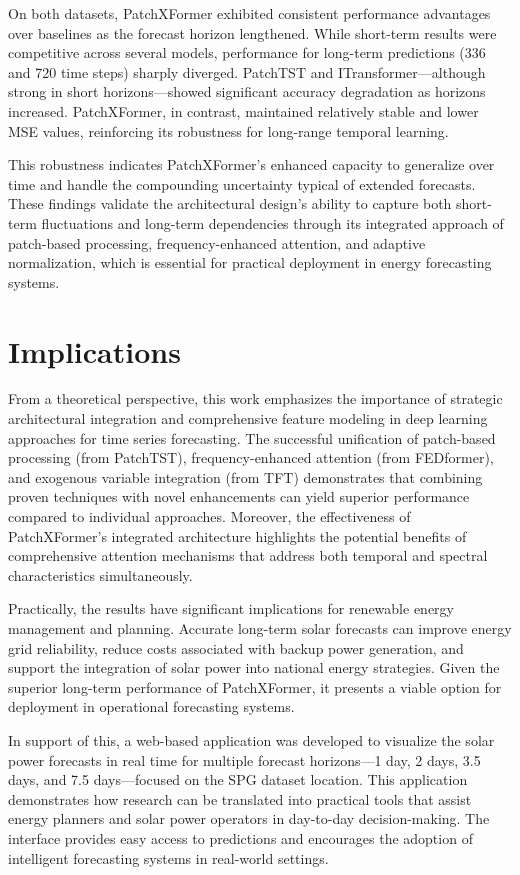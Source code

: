 \documentclass[12pt]{uomthesis}
\begin{document}
On both datasets, PatchXFormer exhibited consistent performance advantages over baselines as the forecast horizon lengthened. While short-term results were competitive across several models, performance for long-term predictions (336 and 720 time steps) sharply diverged. PatchTST and ITransformer—although strong in short horizons—showed significant accuracy degradation as horizons increased. PatchXFormer, in contrast, maintained relatively stable and lower MSE values, reinforcing its robustness for long-range temporal learning.

This robustness indicates PatchXFormer's enhanced capacity to generalize over time and handle the compounding uncertainty typical of extended forecasts. These findings validate the architectural design's ability to capture both short-term fluctuations and long-term dependencies through its integrated approach of patch-based processing, frequency-enhanced attention, and adaptive normalization, which is essential for practical deployment in energy forecasting systems.

\section{Implications}

From a theoretical perspective, this work emphasizes the importance of strategic architectural integration and comprehensive feature modeling in deep learning approaches for time series forecasting. The successful unification of patch-based processing (from PatchTST), frequency-enhanced attention (from FEDformer), and exogenous variable integration (from TFT) demonstrates that combining proven techniques with novel enhancements can yield superior performance compared to individual approaches. Moreover, the effectiveness of PatchXFormer's integrated architecture highlights the potential benefits of comprehensive attention mechanisms that address both temporal and spectral characteristics simultaneously.

Practically, the results have significant implications for renewable energy management and planning. Accurate long-term solar forecasts can improve energy grid reliability, reduce costs associated with backup power generation, and support the integration of solar power into national energy strategies. Given the superior long-term performance of PatchXFormer, it presents a viable option for deployment in operational forecasting systems.

In support of this, a web-based application was developed to visualize the solar power forecasts in real time for multiple forecast horizons—1 day, 2 days, 3.5 days, and 7.5 days—focused on the SPG dataset location. This application demonstrates how research can be translated into practical tools that assist energy planners and solar power operators in day-to-day decision-making. The interface provides easy access to predictions and encourages the adoption of intelligent forecasting systems in real-world settings.
\end{document}
